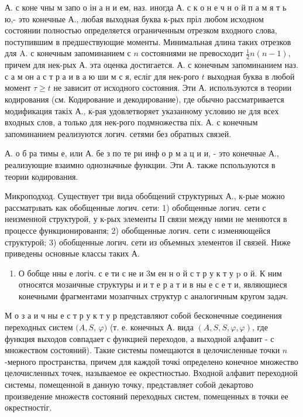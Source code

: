 \documentclass[10pt]{article}
\begin{document}
А. с коне чны м запо о ін а н и ем, наз. иногда А. с к о н е ч н о й п а м я т ь ю,- это конечные А., любая выходная буква к-рых пріл любом исходном состоянии полностью определяется ограниченным отрезком входного слова, поступившим в предшествующие моменты. Минимальная длина таких отрезков для A. с конечным запоминанием с $n$ состояниями не превосходит $\frac{1}{2} n(n-1)$, причем для нек-рых А. эта оценка достигается. А. с конечным запоминанием наз. с а м он а с т р а и в а ю ши м с я, есліг для нек-рого $t$ выходная буква в любой момент $\tau \geqslant t$ не зависит от исходного состояния. Эти А. используются в теории кодирования (см. Кодирование и декодирование), где обычно рассматривается модификация такіх А., к-рая удовлетворяет указанному условию не для всех входных слов, а только для нек-рого подмножества піх. А. с конечным запоминанием реализуются логич. сетями без обратных связей.



А. о б ра тимы е, или А. бе з по те ри инф о р м а ц и и, - это конечные А., реализующие взаимно однозначные функции. Эти А. также пспользуются в теории кодирования.



Микроподход. Существует три вида обобщений структурных А., к-рые можно рассматрıвать как обобщенные логич. сети: 1) обобщенные логич. сети с неизменной структурой, у к-рых элементы ІІ связи между ними не меняются в процессе функционированпя; 2) обобщенные логич. сети с изменяющейся структурой; 3) обобщенные логич. сети из объемных элементов іІ связей. Ниже приведены основные классы таких А.



\begin{enumerate}

  \item О бобще нны е логіч. с е ти с не и 3м ен н о й с т р у к т у $\mathrm{p}$ о й. К ним относятся мозаичные структуры и и т е р а т и в ны е с е т и, являющиеся конечными фрагментами мозапчных структур с аналогичным кругом задач.

\end{enumerate}



М о з а и ч ны е с т р у к т у р представляют собой бесконечные соединения переходных систем $(A, S$, $\varphi)$ (т. е. конечных А. вида $(A, S, S, \varphi, \varphi)$, где функция выходов совпадает с функцией переходов, а выходной алфавит - с множеством состояний). Такие системы помещаются в целочисленные точки $n$-мерного пространства, причем для каждой точкі определено конечное множество целочисленных точек, называемое ее окрестностью. Входной алфавит переходной системы, помещенной в данную точку, представляет собой декартово произведение множеств состояний переходных систем, помещенных в точки ее окрестностіг.
\end{document}
